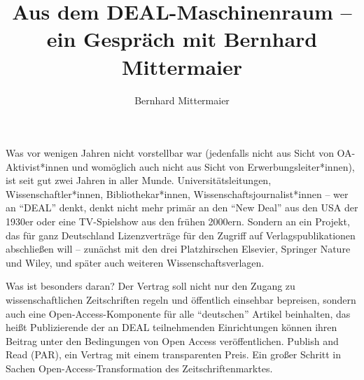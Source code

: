 \documentclass[a4paper,
fontsize=11pt,
oneside,
numbers=noperiodatend,
parskip=half-,
bibliography=totoc,
final
]{scrartcl}
\title{\LARGE{Aus dem DEAL-Maschinenraum -- ein Gespräch mit Bernhard Mittermaier}} %
\author{Bernhard Mittermaier} %
\date{}
\begin{document}
\maketitle
\thispagestyle{fancyplain} 


Was vor wenigen Jahren nicht vorstellbar war (jedenfalls nicht aus Sicht
von OA-Aktivist*innen und womöglich auch nicht aus Sicht von
Erwerbungsleiter*innen), ist seit gut zwei Jahren in aller Munde.
Universitätsleitungen, Wissenschaftler*innen, Bibliothekar*innen,
Wissenschaftsjournalist*innen -- wer an \enquote{DEAL} denkt, denkt
nicht mehr primär an den \enquote{New Deal} aus den USA der 1930er oder
eine TV-Spielshow aus den frühen 2000ern. Sondern an ein Projekt, das
für ganz Deutschland Lizenzverträge für den Zugriff auf
Verlagspublikationen abschließen will -- zunächst mit den drei
Platzhirschen Elsevier, Springer Nature und Wiley, und später auch
weiteren Wissenschaftsverlagen.

Was ist besonders daran? Der Vertrag soll nicht nur den Zugang zu
wissenschaftlichen Zeitschriften regeln und öffentlich einsehbar
bepreisen, sondern auch eine Open-Access-Komponente für alle
\enquote{deutschen} Artikel beinhalten, das heißt Publizierende der an
DEAL teilnehmenden Einrichtungen können ihren Beitrag unter den
Bedingungen von Open Access veröffentlichen. Publish and Read (PAR), ein
Vertrag mit einem transparenten Preis. Ein großer Schritt in Sachen
Open-Access-Transformation des Zeitschriftenmarktes.
\end{document}
